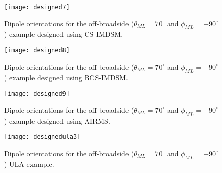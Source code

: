\documentclass[10pt,final]{IEEEtran}
\begin{document}
\begin{figure}
\begin{center}
   \texttt{[image: designed7]}
   \caption{Dipole orientations for the off-broadside ($\theta_{ML}=70^{\circ}$ and $\phi_{ML}=-90^{\circ}$) example designed using CS-IMDSM.
    \label{fig:designed7}}
\end{center}
\end{figure}
\begin{figure}
\begin{center}
   \texttt{[image: designed8]}
   \caption{Dipole orientations for the off-broadside ($\theta_{ML}=70^{\circ}$ and $\phi_{ML}=-90^{\circ}$) example designed using BCS-IMDSM.
    \label{fig:designed8}}
\end{center}
\end{figure}
\begin{figure}
\begin{center}
   \texttt{[image: designed9]}
   \caption{Dipole orientations for the off-broadside ($\theta_{ML}=70^{\circ}$ and $\phi_{ML}=-90^{\circ}$) example designed using AIRMS.
    \label{fig:designed9}}
\end{center}
\end{figure}
\begin{figure}
\begin{center}
   \texttt{[image: designedula3]}
   \caption{Dipole orientations for the off-broadside ($\theta_{ML}=70^{\circ}$ and $\phi_{ML}=-90^{\circ}$) ULA example.
    \label{fig:designedula3}}
\end{center}
\end{figure}
\end{document}
